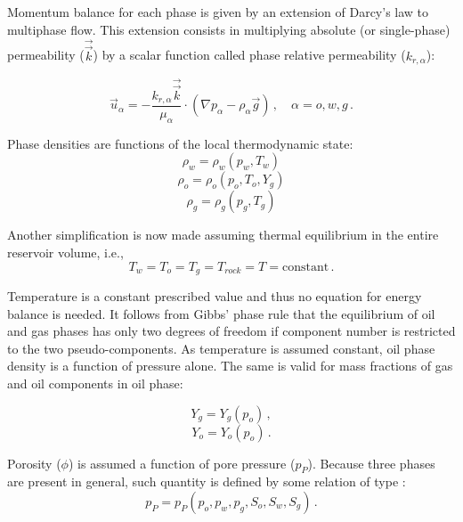 \documentclass[authoryear,preprint,review,11pt]{elsarticle}
\begin{document}
Momentum balance for each phase is given by an extension of Darcy's law to multiphase flow. This extension consists in multiplying absolute (or single-phase) permeability ($\vec{\vec{k}}$) by a scalar function called phase relative permeability ($k_{r,\alpha}$):

\begin{equation}\label{eq: exdarcy}
\vec{u}_\alpha = -\frac{k_{r,\alpha} \vec{\vec{k}}}{\mu_\alpha}\cdot \left(\nabla p_\alpha - \rho_\alpha \vec{g}\right) \, , \quad \alpha=o,w,g \, .
\end{equation}

Phase densities are functions of the local thermodynamic state:
\begin{equation}
\rho_w = \rho_w \left(p_w, T_w\right)
\end{equation}
\begin{equation}
\rho_o = \rho_o \left(p_o, T_o,Y_g\right)
\end{equation}
\begin{equation}
\rho_g = \rho_g \left(p_g, T_g\right)
\end{equation}

Another simplification is now made assuming thermal equilibrium in the entire reservoir volume, i.e.,
\begin{equation}
T_w = T_o = T_g = T_{rock} = T = \text{constant} \, .
\end{equation}

Temperature is a constant prescribed value and thus no equation for energy balance is needed. It follows from Gibbs' phase rule that the equilibrium of oil and gas phases has only two degrees of freedom if component number is restricted to the two pseudo-components. As temperature is assumed constant, oil phase density is a function of pressure alone. The same is valid for mass fractions of gas and oil components in oil phase:

\begin{equation}
Y_g = Y_g (p_o) \, ,
\end{equation}
\begin{equation}
Y_o = Y_o (p_o) \, .
\end{equation}

Porosity ($\phi$) is assumed a function of pore pressure ($p_P$). Because three phases are present in general, such quantity is defined by some relation of type \citep{kim2011rigorous}:
\begin{equation}
p_P=p_P\left(p_o,p_w,p_g,S_o,S_w,S_g\right) \, .
\end{equation}
\end{document}
